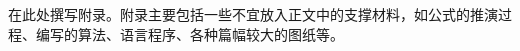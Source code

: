 \begin{myappendix}

    在此处撰写附录。附录主要包括一些不宜放入正文中的支撑材料，如公式的推演过程、编写的算法、语言程序、各种篇幅较大的图纸等。

\end{myappendix}
